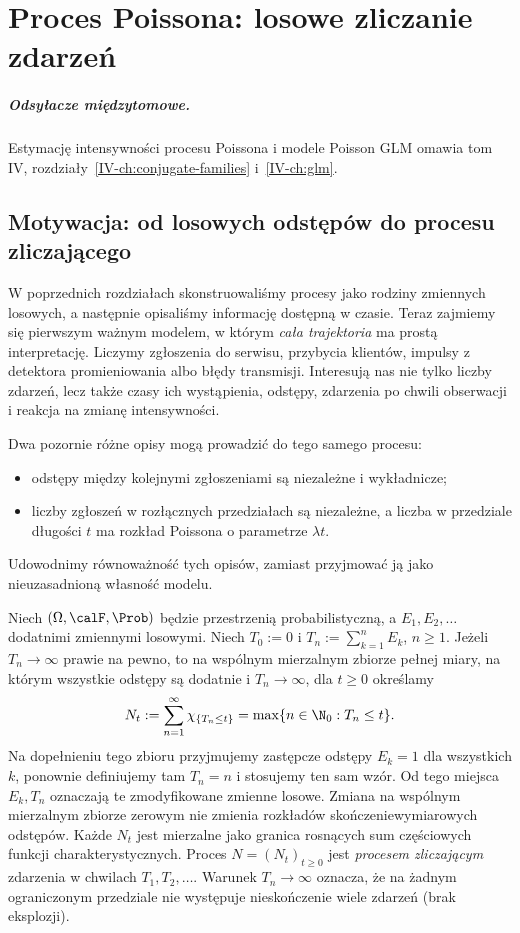 \chapter{Proces Poissona: losowe zliczanie zdarzeń}
\label{ch:poisson-process}
\paragraph{Odsyłacze międzytomowe.} Estymację intensywności procesu Poissona i modele Poisson GLM omawia tom IV, rozdziały~\ref{IV-ch:conjugate-families} i~\ref{IV-ch:glm}.


\section{Motywacja: od losowych odstępów do procesu zliczającego}
W poprzednich rozdziałach skonstruowaliśmy procesy jako rodziny
zmiennych losowych, a następnie opisaliśmy informację dostępną w czasie.
Teraz zajmiemy się pierwszym ważnym modelem, w którym \emph{cała
trajektoria} ma prostą interpretację. Liczymy zgłoszenia do serwisu,
przybycia klientów, impulsy z detektora promieniowania albo błędy
transmisji. Interesują nas nie tylko liczby zdarzeń, lecz także czasy
ich wystąpienia, odstępy, zdarzenia po chwili obserwacji i reakcja na
zmianę intensywności.

Dwa pozornie różne opisy mogą prowadzić do tego samego procesu:
\begin{itemize}
\item odstępy między kolejnymi zgłoszeniami są niezależne i wykładnicze;
\item liczby zgłoszeń w rozłącznych przedziałach są niezależne, a liczba
w przedziale długości $t$ ma rozkład Poissona o parametrze $\lambda t$.
\end{itemize}
Udowodnimy równoważność tych opisów, zamiast przyjmować ją jako
nieuzasadnioną własność modelu.

\begin{definicja}
Niech $(\Omega,\calF,\Prob)$ będzie przestrzenią probabilistyczną,
a $E_1,E_2,\ldots$ dodatnimi zmiennymi losowymi. Niech
$T_0:=0$ i $T_n:=\sum_{k=1}^n E_k$, $n\ge1$.
Jeżeli $T_n\to\infty$ prawie na pewno, to na wspólnym
mierzalnym zbiorze pełnej miary, na którym wszystkie odstępy
są dodatnie i $T_n\to\infty$, dla $t\ge0$ określamy
\[
N_t:=\sum_{n=1}^\infty\chi_{\{T_n\le t\}}
      =\max\{n\in\N_0:T_n\le t\}.
\]
Na dopełnieniu tego zbioru przyjmujemy zastępcze odstępy
$E_k=1$ dla wszystkich $k$, ponownie definiujemy tam
$T_n=n$ i stosujemy ten sam wzór. Od tego miejsca
$E_k,T_n$ oznaczają te zmodyfikowane zmienne losowe.
Zmiana na wspólnym mierzalnym zbiorze zerowym nie zmienia
rozkładów skończeniewymiarowych odstępów. Każde $N_t$ jest mierzalne
jako granica rosnących sum częściowych funkcji charakterystycznych.
Proces $N=(N_t)_{t\ge0}$ jest \emph{procesem zliczającym} zdarzenia
w chwilach $T_1,T_2,\ldots$. Warunek $T_n\to\infty$ oznacza, że na
żadnym ograniczonym przedziale nie występuje nieskończenie wiele
zdarzeń (brak eksplozji).
\end{definicja}

